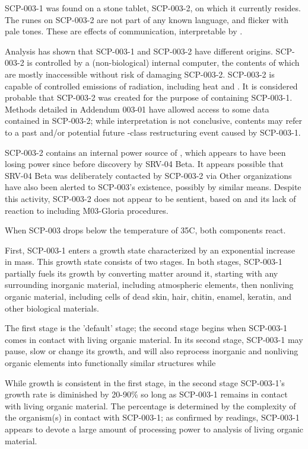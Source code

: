 SCP-003-1 was found on a stone tablet, SCP-003-2, on which it currently resides. The runes on SCP-003-2 are not part of any known language, and flicker with pale tones. These are effects of communication, interpretable by \expunged.

Analysis has shown that SCP-003-1 and SCP-003-2 have different origins. SCP-003-2 is controlled by a (non-biological) internal computer, the contents of which are mostly inaccessible without risk of damaging SCP-003-2. SCP-003-2 is capable of controlled emissions of radiation, including heat and \redacted. It is considered probable that SCP-003-2 was created for the purpose of containing SCP-003-1. Methods detailed in Addendum 003-01 have allowed access to some data contained in SCP-003-2; while interpretation is not conclusive, contents may refer to a past and/or potential future -class restructuring event caused by SCP-003-1.

SCP-003-2 contains an internal power source of \linebreak \expunged, which appears to have been losing power since  before discovery by SRV-04 Beta. It appears possible that SRV-04 Beta was deliberately contacted by SCP-003-2 via \expunged Other organizations have also been alerted to SCP-003's existence, possibly by similar means. Despite this activity, SCP-003-2 does not appear to be sentient, based on \redacted and its lack of reaction to \redacted including M03-Gloria procedures.

When SCP-003 drops below the temperature of 35\degree C, both components react.

First, SCP-003-1 enters a growth state characterized by an exponential increase in mass. This growth state consists of two stages. In both stages, SCP-003-1 partially fuels its growth by converting matter around it, starting with any surrounding inorganic material, including atmospheric elements, then nonliving organic material, including cells of dead skin, hair, chitin, enamel, keratin, and other biological materials.

The first stage is the 'default' stage; the second stage begins when SCP-003-1 comes in contact with living organic material. In its second stage, SCP-003-1 may pause, slow or change its growth, and will also reprocess inorganic and nonliving organic elements into functionally similar structures while \expunged

While growth is consistent in the first stage, in the second stage SCP-003-1's growth rate is diminished by 20-90\% so long as SCP-003-1 remains in contact with living organic material. The percentage is determined by the complexity of the organism(s) in contact with SCP-003-1; as confirmed by \redacted readings, SCP-003-1 appears to devote a large amount of processing power to analysis of living organic material.

